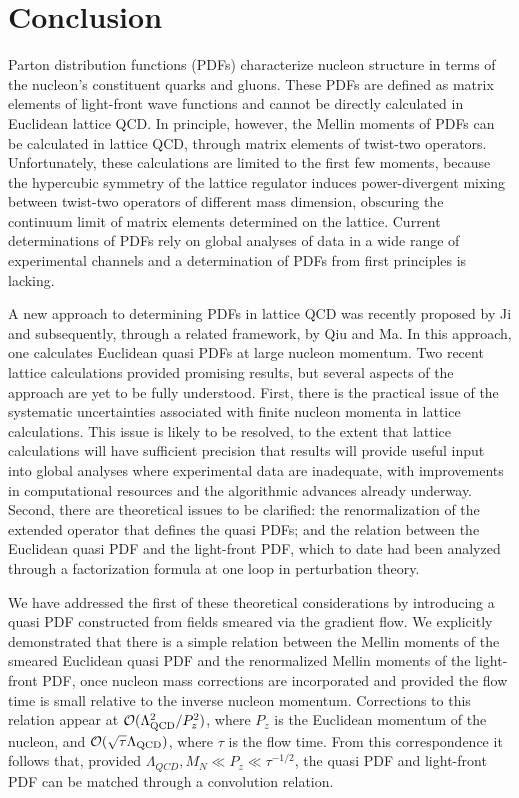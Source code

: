 \section{\label{sec:concs}Conclusion}

Parton distribution functions (PDFs) characterize nucleon structure in terms of 
the nucleon's constituent quarks and gluons. These PDFs are defined as matrix 
elements of light-front wave functions and cannot be directly calculated in 
Euclidean lattice QCD. In principle, however, the Mellin moments of PDFs can be 
calculated in lattice QCD, through matrix elements of twist-two operators. 
Unfortunately, these calculations are limited to the first few moments, because 
the hypercubic symmetry of the lattice regulator induces power-divergent mixing 
between twist-two operators of different mass dimension, obscuring the 
continuum limit of matrix elements determined on the lattice. Current 
determinations of PDFs rely on global analyses of data in a wide range of 
experimental channels and a determination of PDFs from first principles is 
lacking.

A new approach to determining PDFs in lattice QCD was recently proposed by Ji 
and subsequently, through a related framework, by Qiu and Ma. 
In this approach, one calculates Euclidean quasi PDFs at large nucleon 
momentum. Two recent lattice calculations 
provided promising results, but several aspects of the approach are yet to be 
fully understood. First, there is the practical issue of the systematic 
uncertainties associated with finite nucleon momenta in lattice calculations. 
This issue is likely to be resolved, to the extent that lattice 
calculations will have sufficient precision that results will provide
useful input into global analyses where experimental data are inadequate, 
with improvements in computational resources and the algorithmic advances 
already underway. Second, there are theoretical issues to be clarified: the 
renormalization of the extended operator that defines the quasi PDFs; and the 
relation between the Euclidean quasi PDF and the light-front PDF, which to date 
had been analyzed through a factorization formula at one loop in 
perturbation theory.

We have addressed the first of these theoretical considerations by introducing 
a quasi PDF 
constructed from fields smeared via the gradient flow. 
We explicitly demonstrated that there is a 
simple relation between the 
Mellin moments of the smeared Euclidean quasi PDF and the 
renormalized Mellin moments of the light-front PDF, 
once nucleon mass corrections 
are incorporated and provided the flow time is small relative to the inverse 
nucleon momentum. Corrections to this relation appear at 
${\cal O}(\Lambda_{\mathrm{QCD}}^2/P_z^2)$, where $P_z$ is the Euclidean 
momentum of the nucleon, and ${\cal O}(\sqrt{\tau} \Lambda_{\mathrm{QCD}})$, 
where 
$\tau$ is the flow time. From this correspondence it follows that, provided 
$\Lambda_{QCD},M_N\ll P_z \ll \tau^{-1/2}$, the quasi PDF and light-front PDF 
can be matched through a convolution relation. 

